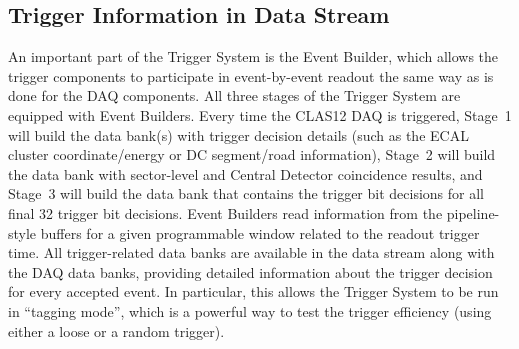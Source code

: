 \subsection{Trigger Information in Data Stream}
\label{sec:trigger_in_datastream}

An important part of the Trigger System is the Event Builder, which allows the trigger components to
participate in event-by-event readout the same way as is done for the DAQ components. All three stages
of the Trigger System are equipped with Event Builders. Every time the CLAS12 DAQ is triggered, Stage~1
will build the data bank(s) with trigger decision details (such as the ECAL cluster coordinate/energy or DC
segment/road information), Stage~2 will build the data bank with sector-level and Central Detector
coincidence results, and Stage~3 will build the data bank that contains the trigger bit decisions for all final
32 trigger bit decisions. Event Builders read information from the pipeline-style buffers for a given
programmable window related to the readout trigger time. All trigger-related data banks are available in the
data stream along with the DAQ data banks, providing detailed information about the trigger decision for
every accepted event. In particular, this allows the Trigger System to be run in ``tagging mode'', which is a
powerful way to test the trigger efficiency (using either a loose or a random trigger).
